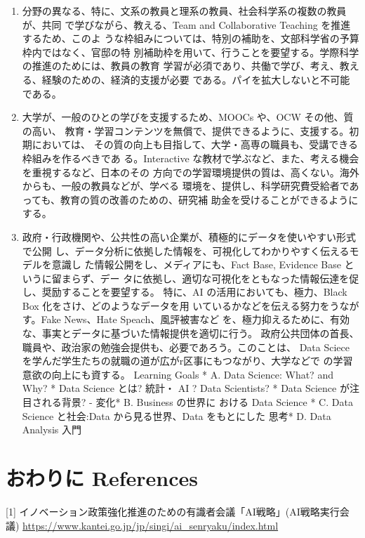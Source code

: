 \documentclass[
]{book}
\providecommand{\tightlist}{%
  \setlength{\itemsep}{0pt}\setlength{\parskip}{0pt}}
\theoremstyle{definition}
\theoremstyle{definition}
\theoremstyle{definition}
\theoremstyle{definition}
\theoremstyle{remark}
\begin{document}
\begin{enumerate}
\def\labelenumi{\arabic{enumi}.}
\setcounter{enumi}{2}
\tightlist
\item
  分野の異なる、特に、文系の教員と理系の教員、社会科学系の複数の教員が、共同 で学びながら、教える、Team and Collaborative Teaching を推進するため、このよ うな枠組みについては、特別の補助を、文部科学省の予算枠内ではなく、官邸の特 別補助枠を用いて、行うことを要望する。学際科学の推進のためには、教員の教育 学習が必須であり、共働で学び、考え、教える、経験のための、経済的支援が必要 である。パイを拡大しないと不可能である。
\item
  大学が、一般のひとの学びを支援するため、MOOCs や、OCW その他、質の高い、 教育・学習コンテンツを無償で、提供できるように、支援する。初期においては、 その質の向上も目指して、大学・高専の職員も、受講できる枠組みを作るべきであ る。Interactive な教材で学ぶなど、また、考える機会を重視するなど、日本のその 方向での学習環境提供の質は、高くない。海外からも、一般の教員などが、学べる 環境を、提供し、科学研究費受給者であっても、教育の質の改善のための、研究補 助金を受けることができるようにする。
\item
  政府・行政機関や、公共性の高い企業が、積極的にデータを使いやすい形式で公開 し、データ分析に依拠した情報を、可視化してわかりやすく伝えるモデルを意識し た情報公開をし、メディアにも、Fact Base, Evidence Base というに留まらず、デー タに依拠し、適切な可視化をともなった情報伝達を促し、奨励することを要望する。 特に、AI の活用においても、極力、Black Box 化をさけ、どのようなデータを用 いているかなどを伝える努力をうながす。Fake News、Hate Speach、風評被害など を、極力抑えるために、有効な、事実とデータに基づいた情報提供を適切に行う。 政府公共団体の首長、職員や、政治家の勉強会提供も、必要であろう。このことは、 Data Sciece を学んだ学生たちの就職の道が広がr区事にもつながり、大学などで の学習意欲の向上にも資する。
  Learning Goals * A. Data Science: What? and Why? * Data Science とは? 統計・ AI ? Data Scientists? * Data Science が注目される背景? - 変化* B. Business の世界に おける Data Science * C. Data Science と社会:Data から見る世界、Data をもとにした 思考* D. Data Analysis 入門
\end{enumerate}

\hypertarget{ux304aux308fux308aux306b-references}{%
\section{おわりに References}\label{ux304aux308fux308aux306b-references}}

{[}1{]} イノベーション政策強化推進のための有識者会議「AI戦略」(AI戦略実行会議) \url{https://www.kantei.go.jp/jp/singi/ai_senryaku/index.html}
\end{document}
